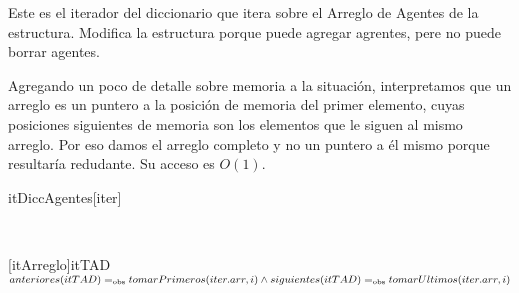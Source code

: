 \begin{Representacion}

Este es el iterador del diccionario que itera sobre el Arreglo de Agentes de la estructura. Modifica la estructura porque puede agregar agrentes, pere no puede borrar agentes.

Agregando un poco de detalle sobre memoria a la situaci\'on, interpretamos que un arreglo es un puntero a la posici\'on de memoria del primer elemento, cuyas posiciones siguientes de memoria son los elementos que le siguen al mismo arreglo. Por eso damos el arreglo completo y no un puntero a \'el mismo porque resultar\'ia redudante. Su acceso es $O(1)$.

  \begin{Estructura}{itDiccAgentes}[iter]
    \begin{Tupla}[iter]
    \end{Tupla}
  \end{Estructura}

   \mbox{}

   ~

   [itArreglo]{itTAD}{$anteriores(itTAD) =_{\mathrm{obs}} tomarPrimeros(iter.arr,i) \land siguientes(itTAD) =_{\mathrm{obs}} tomarUltimos(iter.arr,i)$}

\end{Representacion}

\clearpage


